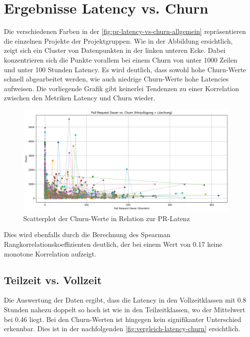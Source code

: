 \section{Ergebnisse Latency vs. Churn}
Die verschiedenen Farben in der  \autoref{fig:pr-latency-vs-churn-allgemein}  repräsentieren die einzelnen Projekte der Projektgruppen.
Wie in der Abbildung ersichtlich, zeigt sich ein Cluster von Datenpunkten in der linken unteren Ecke. Dabei konzentrieren sich die Punkte vorallem bei einem Churn von unter 1000 Zeilen und unter 100 Stunden Latency. Es wird deutlich, dass sowohl hohe Churn-Werte schnell abgearbeitet werden, wie auch niedrige Churn-Werte hohe Latencies aufweisen. Die vorliegende Grafik gibt keinerlei Tendenzen zu einer Korrelation zwischen den Metriken Latency und Churn wieder.
\begin{figure}[th]
    \centering
    \includegraphics[width=\textwidth]{pr-latency-vs-churn-allgemein.png}
    \caption{Scatterplot der Churn-Werte in Relation zur PR-Latenz}
    \label{fig:pr-latency-vs-churn-allgemein}
\end{figure}

Dies wird ebenfalls durch die Berechnung des Spearman Rangkorrelationskoeffizienten deutlich, der bei einem Wert von 0.17 keine monotone Korrelation aufzeigt.

\subsection{Teilzeit vs. Vollzeit}
Die Auswertung der Daten ergibt, dass die Latency in den Vollzeitklassen mit 0.8 Stunden nahezu doppelt so hoch ist wie in den Teilzeitklassen, wo der Mittelwert bei 0.46 liegt. Bei den Churn-Werten ist hingegen kein signifikanter Unterschied erkennbar. Dies ist in der nachfolgenden \autoref{fig:vergleich-latency-churn} ersichtlich.

